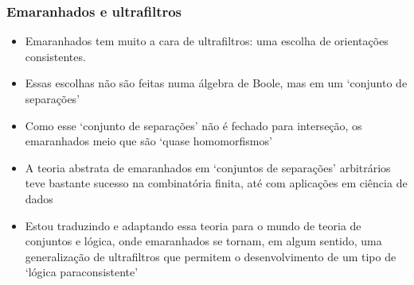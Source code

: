 \begin{frame}{}
\frametitle{Emaranhados e ultrafiltros}

\begin{itemize}
    \item Emaranhados tem muito a cara de ultrafiltros: uma escolha de orientações consistentes. \pause
    \item Essas escolhas não são feitas numa álgebra de Boole, mas em um `conjunto de separações' \pause
    \item Como esse `conjunto de separações' não é fechado para interseção, os emaranhados meio que são `quase homomorfismos' \pause
    \item A teoria abstrata de emaranhados em `conjuntos de separações' arbitrários teve bastante sucesso na combinatória finita, até com aplicações em ciência de dados \pause
    \item Estou traduzindo e adaptando essa teoria para o mundo de teoria de conjuntos e lógica, onde emaranhados se tornam, em algum sentido, uma generalização de ultrafiltros que permitem o desenvolvimento de um tipo de `lógica paraconsistente'

\end{itemize}

\end{frame}




